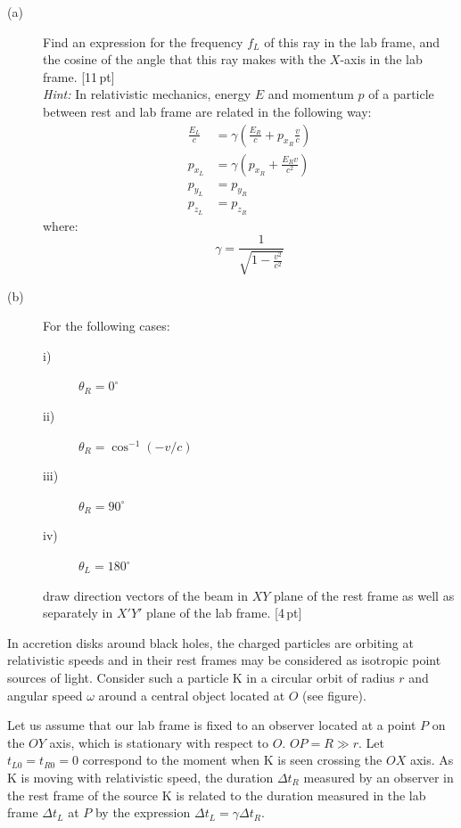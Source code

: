 \begin{description}
\item[(a)] Find an expression for the frequency $f_L$ of this ray in the lab
  frame, and the cosine of the angle that this ray makes with the $X$-axis in
  the lab frame. \hfill[11\,pt]\\
  \textit{Hint:} In relativistic mechanics, energy $E$ and momentum $p$ of a
  particle between rest and lab frame are related in the following way:
  \begin{align*}
    \frac{E_L}{c} &= \gamma\left(\frac{E_R}{c} + p_{x_R}\frac{v}{c}\right)\\
    p_{x_L} &= \gamma\left(p_{x_R} + \frac{E_R v}{c^2}\right)\\
    p_{y_L} &= p_{y_R}\\
    p_{z_L} &= p_{z_R}
  \end{align*}
  where:
  \[ \gamma = \frac{1}{\sqrt{1 - \frac{v^2}{c^2}}} \]
\item[(b)] For the following cases:
  \begin{description}
  \item[i)] $\theta_R = 0^\circ$
  \item[ii)] $\theta_R = \cos^{-1}(-v/c)$
  \item[iii)] $\theta_R = 90^\circ$
  \item[iv)] $\theta_L = 180^\circ$
  \end{description}
  draw direction vectors of the beam in $XY$ plane of the rest frame as well
  as separately in $X'Y'$ plane of the lab frame. \hfill[4\,pt]
\end{description}

In accretion disks around black holes, the charged particles are orbiting at
relativistic speeds and in their rest frames may be considered as isotropic
point sources of light. Consider such a particle K in a circular orbit of
radius $r$ and angular speed $\omega$ around a central object located at $O$
(see figure).


Let us assume that our lab frame is fixed to an observer located at a point
$P$ on the $OY$ axis, which is stationary with respect to $O$.
$OP = R \gg r$. Let $t_{L0} = t_{R0} = 0$ correspond to the moment when K is
seen crossing the $OX$ axis. As K is moving with relativistic speed, the
duration $\Delta t_R$ measured by an observer in the rest frame of the source
K is related to the duration measured in the lab frame $\Delta t_L$ at $P$ by
the expression $\Delta t_L = \gamma\Delta t_R$.

